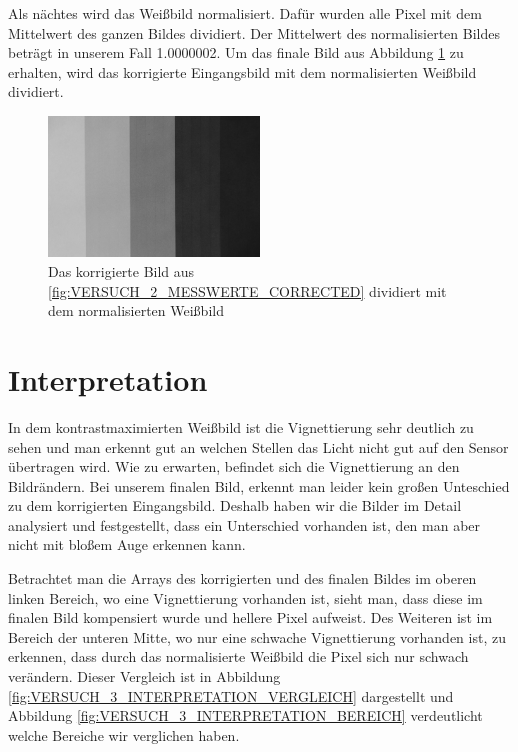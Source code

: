 \documentclass[12pt, oneside, a4paper, \docLanguage]{report}
\begin{document}
Als nächtes wird das Weißbild normalisiert. Dafür wurden alle Pixel mit dem Mittelwert des ganzen Bildes dividiert. Der Mittelwert des normalisierten Bildes beträgt in unserem Fall 1.0000002. Um das finale Bild aus Abbildung \ref{fig:VERSUCH_3_AUSWERTUNG_NORMAL} zu erhalten, wird das korrigierte Eingangsbild mit dem normalisierten Weißbild dividiert. 

\begin{figure}[H]
	\centering\small
	\includegraphics[width=0.5\textwidth]{media/finalImage.png}
	\caption{Das korrigierte Bild aus \ref{fig:VERSUCH_2_MESSWERTE_CORRECTED} dividiert mit dem normalisierten Weißbild}
	\label{fig:VERSUCH_3_AUSWERTUNG_NORMAL}
\end{figure}
\section{Interpretation}
\label{chap:VERSUCH_3_INTERPRETATION}
In dem kontrastmaximierten Weißbild ist die Vignettierung sehr deutlich zu sehen und man erkennt gut an welchen Stellen das Licht nicht gut auf den Sensor übertragen wird. Wie zu erwarten, befindet sich die Vignettierung an den Bildrändern. Bei unserem finalen Bild, erkennt man leider kein großen Unteschied zu dem korrigierten Eingangsbild. Deshalb haben wir die Bilder im Detail analysiert und festgestellt, dass ein Unterschied vorhanden ist, den man aber nicht mit bloßem Auge erkennen kann.

Betrachtet man die Arrays des korrigierten und des finalen Bildes im oberen linken Bereich, wo eine Vignettierung vorhanden ist, sieht man, dass diese im finalen Bild kompensiert wurde und hellere Pixel aufweist. Des Weiteren ist im Bereich der unteren Mitte, wo nur eine schwache Vignettierung vorhanden ist, zu erkennen, dass durch das normalisierte Weißbild die Pixel sich nur schwach verändern. Dieser Vergleich ist in Abbildung \ref{fig:VERSUCH_3_INTERPRETATION_VERGLEICH} dargestellt und Abbildung \ref{fig:VERSUCH_3_INTERPRETATION_BEREICH} verdeutlicht welche Bereiche wir verglichen haben.
\end{document}

